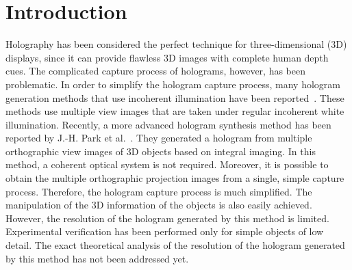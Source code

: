 \documentclass[10pt,letterpaper]{article}
\begin{document}
\section{Introduction}
Holography has been considered the perfect technique for three-dimensional (3D) displays, since it can provide flawless 3D images with complete human depth cues. The complicated capture process of holograms, however, has been problematic. In order to simplify the hologram capture process, many hologram generation methods that use incoherent illumination have been reported~\cite{Shaked_2009_AO}. These methods use multiple view images that are taken under regular incoherent white illumination. Recently, a more advanced hologram synthesis method has been reported by J.-H. Park et al.~\cite{Park_2009_OE}.  They generated a hologram from multiple orthographic view images of 3D objects based on integral imaging. In this method, a coherent optical system is not required. Moreover, it is possible to obtain the multiple orthographic projection images from a single, simple capture process. Therefore, the hologram capture process is much simplified. The manipulation of the 3D information of the objects is also easily achieved. However, the resolution of the hologram generated by this method is limited. Experimental verification has been performed only for simple objects of low detail. The exact theoretical analysis of the resolution of the hologram generated by this method has not been addressed yet. 
\end{document}
